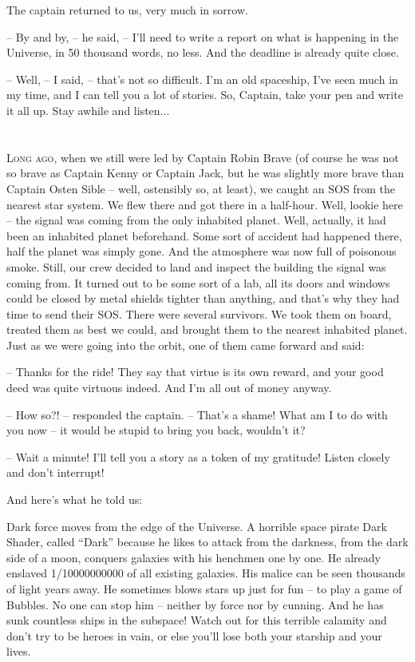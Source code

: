 \documentclass[ebook,twoside,final,openright]{memoir}
\begin{document}
\par
The captain returned to us, very much in sorrow.\par
– By and by, – he said, – I’ll need to write a report on what is happening in the Universe, in 50 thousand words, no less. And the deadline is already quite close.\par
– Well, – I said, – that’s not so difficult. I'm an old spaceship, I’ve seen much in my time, and I can tell you a lot of stories. So, Captain, take your pen and write it all up. Stay awhile and listen...
\chapter{}
\par
\lettrine{L}{ong ago,} when we still were led by Captain Robin Brave (of course he was not so brave as Captain Kenny or Captain Jack, but he was slightly more brave than Captain Osten Sible – well, ostensibly so, at least), we caught an SOS from the nearest star system. We flew there and got there in a half-hour. Well, lookie here – the signal was coming from the only inhabited planet. Well, actually, it had been an inhabited planet beforehand. Some sort of accident had happened there, half the planet was simply gone. And the atmosphere was now full of poisonous smoke. Still, our crew decided to land and inspect the building the signal was coming from. It turned out to be some sort of a lab, all its doors and windows could be closed by metal shields tighter than anything, and that's why they had time to send their SOS. There were several survivors. We took them on board, treated them as best we could, and brought them to the nearest inhabited planet. Just as we were going into the orbit, one of them came forward and said: \par
\par
– Thanks for the ride! They say that virtue is its own reward, and your good deed was quite virtuous indeed. And I’m all out of money anyway.\par
– How so?! – responded the captain. – That's a shame! What am I to do with you now – it would be stupid to bring you back, wouldn’t it? \par
– Wait a minute! I'll tell you a story as a token of my gratitude! Listen closely and don’t interrupt! \par
 And here’s what he told us:\par
\par
Dark force moves from the edge of the Universe. A horrible space pirate Dark Shader, called “Dark” because he likes to attack from the darkness, from the dark side of a moon, conquers galaxies with his henchmen one by one. He already enslaved 1/10000000000 of all existing galaxies. His malice can be seen thousands of light years away. He sometimes blows stars up just for fun – to play a game of Bubbles. No one can stop him – neither by force nor by cunning. And he has sunk countless ships in the subspace! Watch out for this terrible calamity and don’t try to be heroes in vain, or else you’ll lose both your starship and your lives.\par
\end{document}

